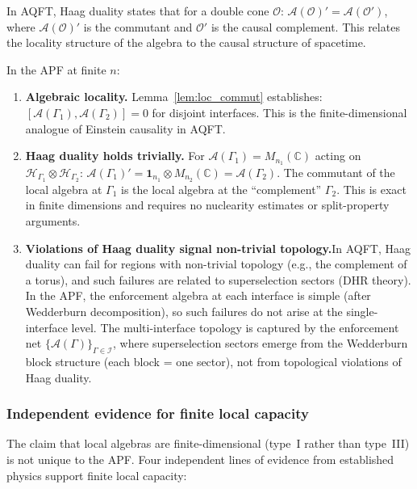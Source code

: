 \documentclass[11pt,a4paper]{article}
\theoremstyle{definition}
\begin{document}
In AQFT, Haag duality states that for a double cone $\mathcal{O}$:
$\mathcal{A}(\mathcal{O})' = \mathcal{A}(\mathcal{O}')$, where
$\mathcal{A}(\mathcal{O})'$ is the commutant and $\mathcal{O}'$ is
the causal complement.  This relates the locality structure of the
algebra to the causal structure of spacetime.

In the APF at finite $n$:
\begin{enumerate}[label=(\alph*),nosep]
  \item \textbf{Algebraic locality.}\quad
  Lemma~\ref{lem:loc_commut} establishes:
  $[\mathcal{A}(\Gamma_1), \mathcal{A}(\Gamma_2)] = 0$
  for disjoint interfaces.  This is the finite-dimensional analogue
  of Einstein causality in AQFT.
  \item \textbf{Haag duality holds trivially.}\quad
  For $\mathcal{A}(\Gamma_1) = M_{n_1}(\mathbb{C})$ acting on
  $\mathcal{H}_{\Gamma_1} \otimes \mathcal{H}_{\Gamma_2}$:
  $\mathcal{A}(\Gamma_1)' = \mathbf{1}_{n_1} \otimes M_{n_2}(\mathbb{C})
  = \mathcal{A}(\Gamma_2)$.
  The commutant of the local algebra at $\Gamma_1$ is the local
  algebra at the ``complement'' $\Gamma_2$.  This is exact in finite
  dimensions and requires no nuclearity estimates or split-property
  arguments.
  \item \textbf{Violations of Haag duality signal non-trivial
  topology.}\quad In AQFT, Haag duality can fail for regions with
  non-trivial topology (e.g., the complement of a torus), and such
  failures are related to superselection sectors (DHR theory).  In
  the APF, the enforcement algebra at each interface is simple
  (after Wedderburn decomposition), so such failures do not arise
  at the single-interface level.  The multi-interface topology is
  captured by the enforcement net
  $\{\mathcal{A}(\Gamma)\}_{\Gamma \in \mathcal{I}}$, where
  superselection sectors emerge from the Wedderburn block structure
  (each block = one sector), not from topological violations of
  Haag duality.
\end{enumerate}


\subsubsection{Independent evidence for finite local capacity}
\label{sec:independent_evidence}

The claim that local algebras are finite-dimensional (type~I rather
than type~III) is not unique to the APF.  Four independent lines of
evidence from established physics support finite local capacity:
\end{document}
